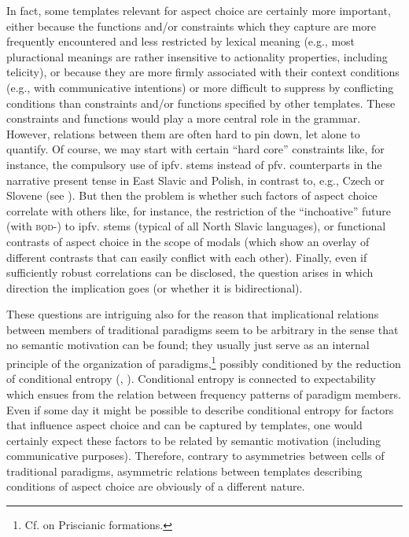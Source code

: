 \documentclass[output=paper]{langscibook}
\begin{document}
In fact, some templates relevant for aspect choice are certainly more important, either because the functions and/or constraints which they capture are more frequently encountered and less restricted by lexical meaning (e.g., most pluractional meanings are rather insensitive to actionality properties, including telicity), or because they are more firmly associated with their context conditions (e.g., with communicative intentions) or more difficult to suppress by conflicting conditions than constraints and/or functions specified by other templates. These constraints and functions would play a more central role in the grammar. However, relations between them are often hard to pin down, let alone to quantify. Of course, we may start with certain “hard core” constraints like, for instance, the compulsory use of ipfv. stems instead of pfv. counterparts in the narrative present tense in East Slavic and Polish, in contrast to, e.g., Czech or Slovene (see ). But then the problem is whether such factors of aspect choice correlate with others like, for instance, the restriction of the ``inchoative'' future (with \textsc{bǫd-}) to ipfv. stems (typical of all North Slavic languages), or functional contrasts of aspect choice in the scope of modals (which show an overlay of different contrasts that can easily conflict with each other). Finally, even if sufficiently robust correlations can be disclosed, the question arises in which direction the implication goes (or whether it is bidirectional).

These questions are intriguing also for the reason that implicational relations between members of traditional paradigms seem to be arbitrary in the sense that no semantic motivation can be found; they usually just serve as an internal principle of the organization of paradigms,\footnote{Cf. \citet[172--174]{HaspelmathSims2010} on Priscianic formations.} possibly conditioned by the reduction of conditional entropy (\citealt{MilinEtAl2009}, \citealt[7]{Blevins2016}). Conditional entropy is connected to expectability which ensues from the relation between frequency patterns of paradigm members. Even if some day it might be possible to describe conditional entropy for factors that influence aspect choice and can be captured by templates, one would certainly expect these factors to be related by semantic motivation (including communicative purposes). Therefore, contrary to asymmetries between cells of traditional paradigms, asymmetric relations between templates describing conditions of aspect choice are obviously of a different nature.
\end{document}
